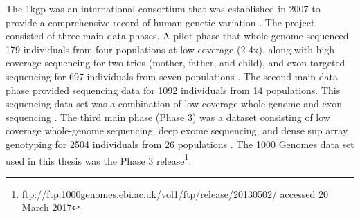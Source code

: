 \documentclass[twoside,openright]{report}
\begin{document}
The \glsdesc{1kgp} was an international consortium that was established
in 2007 to provide a comprehensive record of human genetic variation
\citep{siva2008}. The project consisted of three main data phases. A
pilot phase that whole-genome sequenced 179 individuals from four
populations at low coverage (2-4x), along with high coverage sequencing
for two trios (mother, father, and child), and exon targeted sequencing
for 697 individuals from seven populations \citep{1KGP2010}. The second
main data phase provided sequencing data for 1092 individuals from 14
populations. This sequencing data set was a combination of low coverage
whole-genome and exon sequencing \citep{1KGP2012}. The third main phase
(Phase 3) was a dataset consisting of low coverage whole-genome
sequencing, deep exome sequencing, and dense \gls{snp} array genotyping
for 2504 individuals from 26 populations \citep{1KGP2015snp}. The 1000
Genomes data set used in this thesis was the Phase 3 release\footnote{\url{ftp://ftp.1000genomes.ebi.ac.uk/vol1/ftp/release/20130502/}
  accessed 20 March 2017}.
\end{document}
